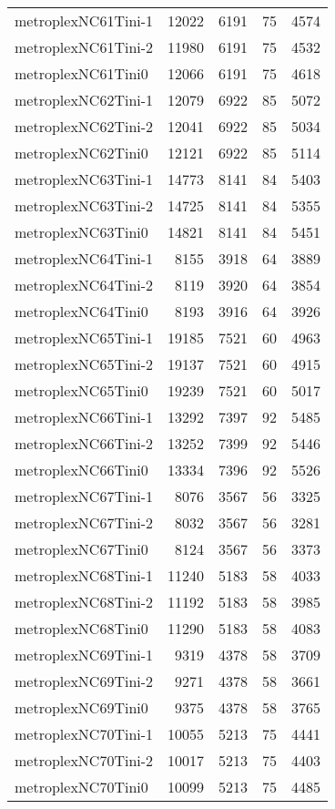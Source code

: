 \begin{longtable}{lrrrr}
metroplexNC61Tini-1 & 12022 & 6191 & 75 & 4574 \\
metroplexNC61Tini-2 & 11980 & 6191 & 75 & 4532 \\
metroplexNC61Tini0 & 12066 & 6191 & 75 & 4618 \\
metroplexNC62Tini-1 & 12079 & 6922 & 85 & 5072 \\
metroplexNC62Tini-2 & 12041 & 6922 & 85 & 5034 \\
metroplexNC62Tini0 & 12121 & 6922 & 85 & 5114 \\
metroplexNC63Tini-1 & 14773 & 8141 & 84 & 5403 \\
metroplexNC63Tini-2 & 14725 & 8141 & 84 & 5355 \\
metroplexNC63Tini0 & 14821 & 8141 & 84 & 5451 \\
metroplexNC64Tini-1 & 8155 & 3918 & 64 & 3889 \\
metroplexNC64Tini-2 & 8119 & 3920 & 64 & 3854 \\
metroplexNC64Tini0 & 8193 & 3916 & 64 & 3926 \\
metroplexNC65Tini-1 & 19185 & 7521 & 60 & 4963 \\
metroplexNC65Tini-2 & 19137 & 7521 & 60 & 4915 \\
metroplexNC65Tini0 & 19239 & 7521 & 60 & 5017 \\
metroplexNC66Tini-1 & 13292 & 7397 & 92 & 5485 \\
metroplexNC66Tini-2 & 13252 & 7399 & 92 & 5446 \\
metroplexNC66Tini0 & 13334 & 7396 & 92 & 5526 \\
metroplexNC67Tini-1 & 8076 & 3567 & 56 & 3325 \\
metroplexNC67Tini-2 & 8032 & 3567 & 56 & 3281 \\
metroplexNC67Tini0 & 8124 & 3567 & 56 & 3373 \\
metroplexNC68Tini-1 & 11240 & 5183 & 58 & 4033 \\
metroplexNC68Tini-2 & 11192 & 5183 & 58 & 3985 \\
metroplexNC68Tini0 & 11290 & 5183 & 58 & 4083 \\
metroplexNC69Tini-1 & 9319 & 4378 & 58 & 3709 \\
metroplexNC69Tini-2 & 9271 & 4378 & 58 & 3661 \\
metroplexNC69Tini0 & 9375 & 4378 & 58 & 3765 \\
metroplexNC70Tini-1 & 10055 & 5213 & 75 & 4441 \\
metroplexNC70Tini-2 & 10017 & 5213 & 75 & 4403 \\
metroplexNC70Tini0 & 10099 & 5213 & 75 & 4485 \\

\end{longtable}
